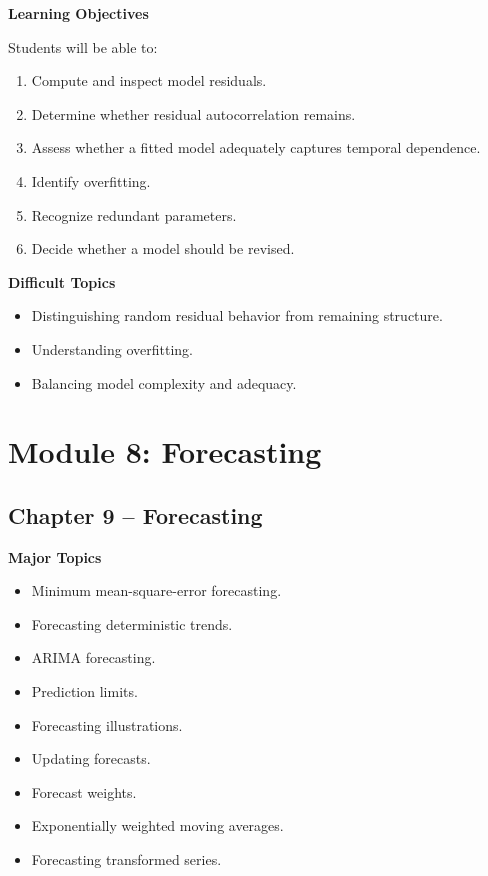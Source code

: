 \documentclass[11pt,a4paper]{article}
\begin{document}
\textbf{Learning Objectives}

Students will be able to:

\begin{enumerate}
    \item Compute and inspect model residuals.
    \item Determine whether residual autocorrelation remains.
    \item Assess whether a fitted model adequately captures temporal dependence.
    \item Identify overfitting.
    \item Recognize redundant parameters.
    \item Decide whether a model should be revised.
\end{enumerate}

\textbf{Difficult Topics}

\begin{itemize}
    \item Distinguishing random residual behavior from remaining structure.
    \item Understanding overfitting.
    \item Balancing model complexity and adequacy.
\end{itemize}

\section{Module 8: Forecasting}

\subsection{Chapter 9 -- Forecasting}

\textbf{Major Topics}

\begin{itemize}
    \item Minimum mean-square-error forecasting.
    \item Forecasting deterministic trends.
    \item ARIMA forecasting.
    \item Prediction limits.
    \item Forecasting illustrations.
    \item Updating forecasts.
    \item Forecast weights.
    \item Exponentially weighted moving averages.
    \item Forecasting transformed series.
\end{itemize}
\end{document}
